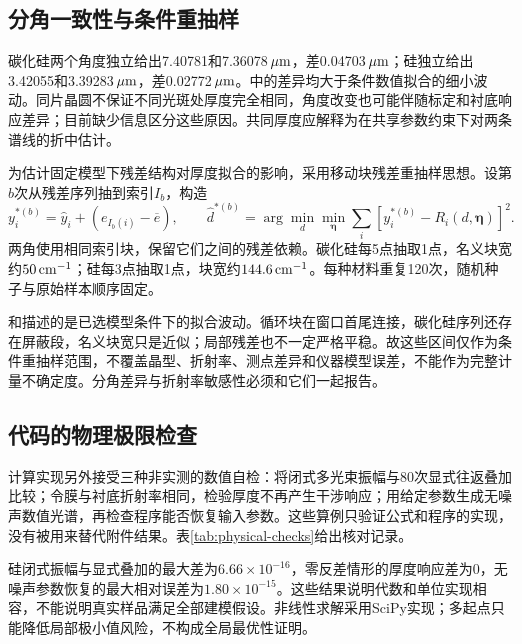 \subsection{分角一致性与条件重抽样}
碳化硅两个角度独立给出7.40781和7.36078$\,\mu\mathrm{m}$，差0.04703$\,\mu\mathrm{m}$；硅独立给出3.42055和3.39283$\,\mu\mathrm{m}$，差0.02772$\,\mu\mathrm{m}$。中的差异均大于条件数值拟合的细小波动。同片晶圆不保证不同光斑处厚度完全相同，角度改变也可能伴随标定和衬底响应差异；目前缺少信息区分这些原因。共同厚度应解释为在共享参数约束下对两条谱线的折中估计。

为估计固定模型下残差结构对厚度拟合的影响，采用移动块残差重抽样思想\cite{Kunsch1989}。设第$b$次从残差序列抽到索引$I_b$，构造
\begin{equation}
 y_i^{*(b)}=\widehat y_i+(e_{I_b(i)}-\overline e),\qquad
 \widehat d^{*(b)}=\arg\min_d\min_{\boldsymbol\eta}
     \sum_i\left[y_i^{*(b)}-R_i(d,\boldsymbol\eta)\right]^2.
 \label{eq:block-bootstrap}
\end{equation}
两角使用相同索引块，保留它们之间的残差依赖。碳化硅每5点抽取1点，名义块宽约$50\,\mathrm{cm}^{-1}$；硅每3点抽取1点，块宽约$144.6\,\mathrm{cm}^{-1}$。每种材料重复120次，随机种子与原始样本顺序固定。


和描述的是已选模型条件下的拟合波动。循环块在窗口首尾连接，碳化硅序列还存在屏蔽段，名义块宽只是近似；局部残差也不一定严格平稳。故这些区间仅作为条件重抽样范围，不覆盖晶型、折射率、测点差异和仪器模型误差，不能作为完整计量不确定度。分角差异与折射率敏感性必须和它们一起报告\cite{JCGM2008}。

\subsection{代码的物理极限检查}
计算实现另外接受三种非实测的数值自检：将闭式多光束振幅与80次显式往返叠加比较；令膜与衬底折射率相同，检验厚度不再产生干涉响应；用给定参数生成无噪声数值光谱，再检查程序能否恢复输入参数。这些算例只验证公式和程序的实现，没有被用来替代附件结果。表\ref{tab:physical-checks}给出核对记录。


硅闭式振幅与显式叠加的最大差为$6.66\times10^{-16}$，零反差情形的厚度响应差为0，无噪声参数恢复的最大相对误差为$1.80\times10^{-15}$。这些结果说明代数和单位实现相容，不能说明真实样品满足全部建模假设。非线性求解采用SciPy实现\cite{Virtanen2020}；多起点只能降低局部极小值风险，不构成全局最优性证明。
